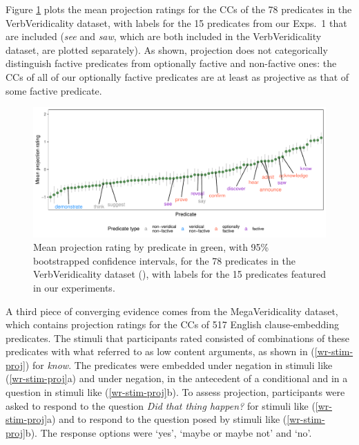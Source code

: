 \documentclass[11pt,fleqn]{article}
\newcommand{\6}{\mbox{$[\hspace*{-.6mm}[$}}
\newcommand{\9}{\mbox{$]\hspace*{-.6mm}]$}}
\begin{document}
Figure \ref{f-vv-projectivity} plots the mean projection ratings for the CCs of the 78 predicates in the VerbVeridicality dataset, with labels for the 15 predicates from our Exps.~1 that are included ({\em see} and {\em saw}, which are both included in the VerbVeridicality dataset, are plotted separately). As shown, projection does not categorically distinguish factive predicates from optionally factive and non-factive ones: the CCs of all of our optionally factive predicates are at least as projective as that of some factive predicate. 

\begin{figure}[H]
\centering
\includegraphics[width=.77\paperwidth]{../../VerbVeridicality-analysis/graphs/means-projection-by-predicate}

\caption{Mean projection rating by predicate in green, with 95\% bootstrapped confidence intervals, for the 78 predicates in the VerbVeridicality dataset (\citealt{ross-pavlick2019}), with labels for the 15 predicates featured in our experiments.}
\label{f-vv-projectivity}
\end{figure}



A third piece of converging evidence comes from the MegaVeridicality dataset, which contains projection ratings for the CCs of 517 English clause-embedding predicates. The stimuli that participants rated consisted of combinations of these predicates with what \citet{white-rawlins-nels2018} referred to as low content arguments, as shown in (\ref{wr-stim-proj}) for {\em know}. The predicates were embedded under negation in stimuli like (\ref{wr-stim-proj}a) and under negation, in the antecedent of a conditional and in a question in stimuli like (\ref{wr-stim-proj}b). To assess projection, participants were asked to respond to the question {\em Did that thing happen?} for stimuli like (\ref{wr-stim-proj}a) and to respond to the question posed by stimuli like (\ref{wr-stim-proj}b). The response options were `yes', `maybe or maybe not' and `no'. 
\end{document}
